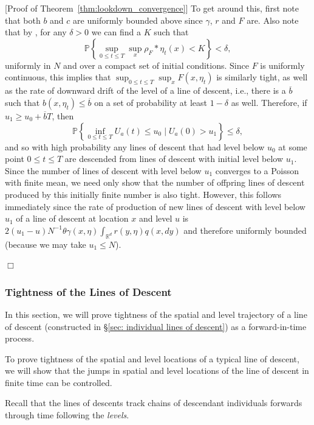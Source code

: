 \documentclass[12pt]{article}
\newenvironment {proof}{{\noindent\bf Proof }}{\hfill $\Box$ \medskip}
\def \bar{\overline}
\newcommand{\IP}{\mathbb P}
\newcommand{\IR}{\mathbb R}
\newcommand{\kernel}{\rho}  %
\newcommand{\smooth}[1]{\kernel_{#1} \! * \!}  %
\newcommand{\plr}[1]{\todo[inline]{Peter: #1}}
\begin{document}
\begin{proof}[Proof of Theorem~\ref{thm:lookdown_convergence}]
    To get around this,
    first note that both $b$ and $c$ are uniformly bounded above since $\gamma$, $r$ and $F$ are.
    Also note that by \plr{TODO},
    for any $\delta > 0$ we can find a $K$ such that
    $$
    \IP\left\{
        \sup_{0 \le t \le T} \sup_x \smooth{F} \eta_t(x) < K
        \right\} < \delta,
    $$
    uniformly in $N$ and over a compact set of initial conditions.
    Since $F$ is uniformly continuous, this implies that $\sup_{0 \le t \le T} \sup_x F(x, \eta_t)$
    is similarly tight,
    as well as the rate of downward drift of the level of a line of descent,
    i.e., there is a $\bar b$ such that $b(x, \eta_t) \le \bar b$
    on a set of probability at least $1-\delta$ as well.
    Therefore, if $u_1 \ge u_0 + \bar b T$, then
    $$
    \IP\left\{
        \inf_{0 \le t \le T} U_a(t) \le u_0
        \;\big|\;
        U_a(0) > u_1
    \right\}
    \le \delta ,
    $$
    and so with high probability any lines of descent that had level below $u_0$
    at some point $0 \le t \le T$
    are descended from lines of descent with initial level below $u_1$.
    Since the number of lines of descent with level below $u_1$
    converges to a Poisson with finite mean,
    we need only show that the number of offpring lines of descent
    produced by this initially finite number is also tight.
    However, this follows immediately
    since the rate of production of new lines of descent with level below $u_1$
    of a line of descent at location $x$ and level $u$ is
    $2 (u_1 - u) N^{-1} \theta \gamma(x, \eta) \int_{\IR^d} r(y, \eta) q(x, dy)$
    and therefore uniformly bounded (because we may take $u_1 \le N$).


\end{proof}

\subsubsection{Tightness of the Lines of Descent}
    \label{sec:lookdown_tightness_proofs}

In this section,
we will prove tightness
of the spatial and level trajectory
of a line of descent
(constructed in \S \ref{sec: individual lines of descent})
as a forward-in-time process.

To prove tightness of the 
spatial and level locations
of a typical line of descent,
we will show that the
jumps in
spatial and level locations
of the line of descent
in finite time
can be controlled.

Recall that the lines of descents
track chains of descendant
individuals forwards through time following the \textit{levels}.
\end{document}
